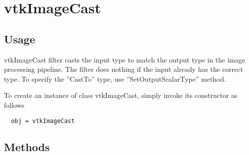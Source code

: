 \section{vtkImageCast}

\subsection{Usage}

 vtkImageCast filter casts the input type to match the output type in
 the image processing pipeline.  The filter does nothing if the input
 already has the correct type.  To specify the ''CastTo'' type,
 use ''SetOutputScalarType'' method.

To create an instance of class vtkImageCast, simply
invoke its constructor as follows
\begin{verbatim}
  obj = vtkImageCast
\end{verbatim}
\subsection{Methods}

